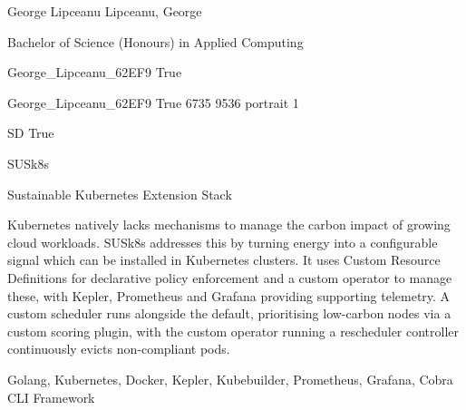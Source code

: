 \documentclass[twoside]{report}
\begin{document}
\begingroup{}\relax



\def\Key{George_Lipceanu_62EF9}

{George Lipceanu}
{Lipceanu, George}

{Bachelor of Science (Honours) in Applied Computing}

{George_Lipceanu_62EF9}
{True}

{George_Lipceanu_62EF9}
{True}
{6735}
{9536}
{portrait}
{1}

{SD}
{True}

{SUSk8s}

{Sustainable Kubernetes Extension Stack}

{Kubernetes natively lacks mechanisms to manage the carbon impact of growing cloud workloads. SUSk8s addresses this by turning energy into a configurable signal which can be installed in Kubernetes clusters. It uses Custom Resource Definitions for declarative policy enforcement and a custom operator to manage these, with Kepler, Prometheus and Grafana providing supporting telemetry.  A custom scheduler runs alongside the default, prioritising low-carbon nodes via a custom scoring plugin, with the custom operator running a rescheduler controller continuously evicts non-compliant pods.}

{Golang, Kubernetes, Docker, Kepler, Kubebuilder, Prometheus, Grafana, Cobra CLI Framework}
\end{document}
